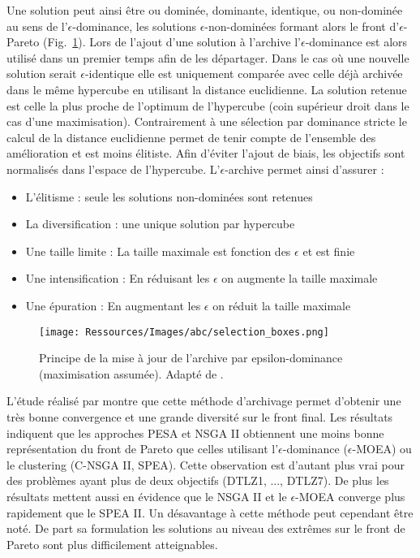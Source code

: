 Une solution peut ainsi être ou dominée, dominante, identique, ou non-dominée au
sens de l’$\epsilon$-dominance, les solutions $\epsilon$-non-dominées formant alors
le front d’$\epsilon$-Pareto (Fig.~\ref{fig:epsilon_dominance}).
Lors de l’ajout d’une solution à l’archive l’$\epsilon$-dominance est alors utilisé
dans un premier temps afin de les départager.
Dans le cas où une nouvelle solution serait $\epsilon$-identique elle est uniquement
comparée avec celle déjà archivée dans le même hypercube en utilisant la distance euclidienne.
La solution retenue est celle la plus proche de l’optimum de l’hypercube (coin supérieur
droit dans le cas d’une maximisation).
Contrairement à une sélection par dominance stricte le calcul de la distance euclidienne
permet de tenir compte de l’ensemble des amélioration et est moins élitiste.
Afin d’éviter l’ajout de biais, les objectifs sont normalisés dans l’espace de l’hypercube.
L’$\epsilon$-archive permet ainsi d’assurer :
\begin{itemize}
  \item L’élitisme : seule les solutions non-dominées sont retenues
  \item La diversification : une unique solution par hypercube
  \item Une taille limite : La taille maximale est fonction des $\epsilon$ et est finie
  \item Une intensification : En réduisant les $\epsilon$ on augmente la taille maximale
  \item Une épuration : En augmentant les $\epsilon$ on réduit la taille maximale
\end{itemize}

\begin{figure}
    \begin{center}
        \texttt{[image: Ressources/Images/abc/selection\_boxes.png]}
    \end{center}
    \caption{Principe de la mise à jour de l’archive par epsilon-dominance (maximisation assumée).
             Adapté de \cite{Deb2005501}.
             \label{fig:epsilon_dominance}}
\end{figure}

L’étude réalisé par \cite{Deb2005501} montre que cette méthode d’archivage permet
d’obtenir une très bonne convergence et une grande diversité sur le front final.
Les résultats indiquent que les approches PESA et NSGA II obtiennent une moins
bonne représentation du front de Pareto que celles utilisant l’$\epsilon$-dominance
($\epsilon$-MOEA) ou le clustering (C-NSGA II, SPEA).
Cette observation est d’autant plus vrai pour des problèmes ayant plus de deux
objectifs (DTLZ1, ..., DTLZ7).
De plus les résultats mettent aussi en évidence que le NSGA II et le $\epsilon$-MOEA
converge plus rapidement que le SPEA II.
Un désavantage à cette méthode peut cependant être noté. De part sa formulation
les solutions au niveau des extrêmes sur le front de Pareto sont plus difficilement
atteignables.

